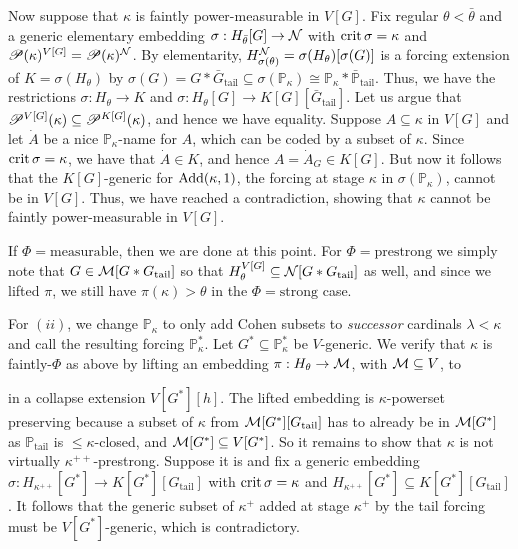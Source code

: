 \documentclass[../../main]{subfiles}
\begin{document}
{\qquad Now suppose that $\kappa$ is faintly power-measurable in $V[G]$. Fix regular $\theta<\bar\theta$ and a generic elementary embedding $\sigma:H_{\bar\theta}[G]\to \operatorname{\mathcal N}$ with $\operatorname{crit}\sigma=\kappa$ and $\mathscr P(\kappa)^{V[G]}=\mathscr P(\kappa)^{\operatorname{\mathcal N}}$. By elementarity, $H_{\sigma(\theta)}^{\operatorname{\mathcal N}}=\sigma(H_\theta)[\sigma(G)]$ is a forcing extension of $K=\sigma(H_\theta)$ by $\sigma(G)=G*\bar G_{\text{tail}}\subseteq \sigma(\mathbb P_\kappa)\cong \mathbb P_\kappa*\bar{\mathbb P}_{\text{tail}}$. Thus, we have the restrictions $\sigma:H_\theta\to K$ and $\sigma:H_\theta[G]\to K[G][\bar G_{\text{tail}}]$. Let us argue that $\mathscr P^{V[G]}(\kappa)\subseteq \mathscr P^{K[G]}(\kappa)$, and hence we have equality. Suppose $A\subseteq\kappa$ in $V[G]$ and let $\dot A$ be a nice $\mathbb P_\kappa$-name for $A$, which can be coded by a subset of $\kappa$. Since $\operatorname{crit}\sigma=\kappa$, we have that $\dot A\in K$, and hence $A=\dot A_G\in K[G]$. But now it follows that the $K[G]$-generic for ${\rm Add}(\kappa,1)$, the forcing at stage $\kappa$ in $\sigma(\mathbb P_\kappa)$, cannot be in $V[G]$. Thus, we have reached a contradiction, showing that $\kappa$ cannot be faintly power-measurable in $V[G]$.

\qquad If $\Phi = \text{measurable}$, then we are done at this point. For $\Phi = \text{prestrong}$ we simply note that $G\in\operatorname{\mathcal M}[G*G_{\text{tail}}]$ so that $H_\theta^{V[G]}\subseteq\operatorname{\mathcal N}[G*G_{\text{tail}}]$ as well, and since we lifted $\pi$, we still have $\pi(\kappa) > \theta$ in the $\Phi = \text{strong}$ case.

  \qquad For $(ii)$, we change $\mathbb P_\kappa$ to only add Cohen subsets to \textit{successor} cardinals $\lambda<\kappa$ and call the resulting forcing $\mathbb P^*_\kappa$. Let $G^*\subseteq \mathbb P^*_\kappa$ be $V$-generic. We verify that $\kappa$ is faintly-$\Phi$ as above by lifting an embedding $\pi:H_\theta\to \operatorname{\mathcal M}$, with $\operatorname{\mathcal M}\subseteq V$, to
  
  in a collapse extension $V[G^*][h]$. The lifted embedding is $\kappa$-powerset preserving because a subset of $\kappa$ from $\operatorname{\mathcal M}[G^*][G_{\text{tail}}]$ has to already be in $\operatorname{\mathcal M}[G^*]$ as $\mathbb P_{\text{tail}}$ is ${\leq}\kappa$-closed, and $\operatorname{\mathcal M}[G^*]\subseteq V[G^*]$. So it remains to show that $\kappa$ is not virtually $\kappa^{++}$-prestrong. Suppose it is and fix a generic embedding $\sigma:H_{\kappa^{++}}[G^*]\to K[G^*][G_{\text{tail}}]$ with $\operatorname{crit}\sigma=\kappa$ and $H_{\kappa^{++}}[G^*]\subseteq K[G^*][G_{\text{tail}}]$. It follows that the generic subset of $\kappa^+$ added at stage $\kappa^+$ by the tail forcing must be $V[G^*]$-generic, which is contradictory.
}
\end{document}
